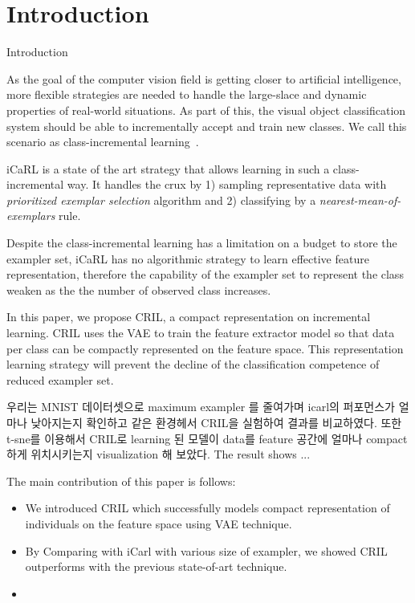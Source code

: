 \section{Introduction}
\label{sec:introduction}

Introduction

As the goal of the computer vision field is getting closer to artificial intelligence, more flexible strategies are needed to handle the large-slace and dynamic properties of real-world situations. As part of this, the visual object classification system should be able to incrementally accept and train new classes. We call this scenario as class-incremental learning~\cite{Rebuffi:2016aa}.

iCaRL is a state of the art strategy that allows learning in such a class-incremental way. It handles the crux by 1) sampling representative data with \textit{prioritized exemplar selection} algorithm and 2) classifying by a \textit{nearest-mean-of-exemplars} rule.

Despite the class-incremental learning has a limitation on a budget to store the exampler set, iCaRL has no algorithmic strategy to learn effective feature representation, therefore the capability of the exampler set to represent the class weaken as the the number of observed class increases.

In this paper, we propose CRIL, a compact representation on incremental learning. CRIL uses the VAE to train the feature extractor model so that data per class can be compactly represented on the feature space. This representation learning strategy will prevent the decline of the classification competence of reduced exampler set.



우리는 MNIST 데이터셋으로 maximum exampler 를 줄여가며 icarl의 퍼포먼스가 얼마나 낮아지는지 확인하고 같은 환경헤서 CRIL을 실험하여 결과를 비교하였다. 또한 t-sne를 이용해서 CRIL로 learning 된 모델이 data를 feature 공간에 얼마나 compact하게 위치시키는지 visualization 해 보았다. The result shows ...

The main contribution of this paper is follows:
\begin{itemize}
\item We introduced CRIL which successfully models compact representation of individuals on the feature space using VAE technique.
\item By Comparing with iCarl with various size of exampler, we showed CRIL outperforms with the previous state-of-art technique.
\item {}
\end{itemize}
